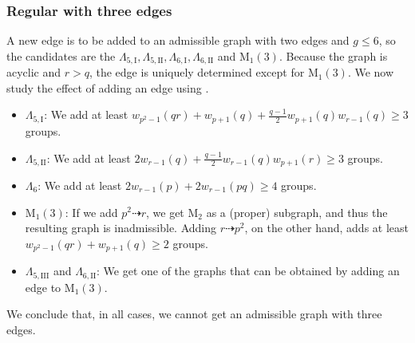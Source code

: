 \documentclass{article}
\newcommand{\qlame}{\Lambda_{5,\text{I}}}
\newcommand{\qlamz}{\Lambda_{5,\text{II}}}
\newcommand{\qlamd}{\Lambda_{5,\text{III}}}
\newcommand{\slame}{\Lambda_{6, \text{I}}}
\newcommand{\slamz}{\Lambda_{6, \text{II}}}
\newcommand{\m}[1]{\text{M}_{#1}}
\newcommand{\hthref}[1]{\hyperref[#1]{\thref{#1}}}
\theoremstyle{plain}
\theoremstyle{definition}
\begin{document}
\begin{center}
\end{center}
\subsubsection*{Regular  with three edges}
A new edge is to be added to an admissible graph with two edges and $g \le 6$, so the candidates are the $\qlame, \qlamz, \slame, \slamz$ and $\m1(3)$. Because the graph is acyclic and $r > q$, the edge is uniquely determined except for $\m1(3)$. We now study the effect of adding an edge using \hthref{euppqr}.
\begin{itemize}
	\item $\qlame$: We add at least $w_{p^2 - 1}(qr) + w_{p + 1}(q) + \frac{q - 1}{2}w_{p + 1}(q)w_{r - 1}(q) \ge 3$ groups.
	\item $\qlamz$: We add at least $2w_{r - 1}(q) + \frac{q - 1}{2} w_{r - 1}(q)w_{p + 1}(r) \ge 3$ groups.
	\item $\Lambda_6$: We add at least $2w_{r - 1}(p) + 2w_{r - 1}(pq) \ge 4$ groups.
	\item $\m1(3)$: If we add $p^2 \dashrightarrow r$, we get $\m{2}$ as a (proper) subgraph, and thus the resulting graph is inadmissible. Adding $r \dashrightarrow p^2$, on the other hand, adds at least $w_{p^2 - 1}(qr) + w_{p + 1}(q) \ge 2$ groups. \nopagebreak[4]
	\item $\qlamd$ and $\slamz$: We get one of the graphs that can be obtained by adding an edge to $\m1(3)$.
\end{itemize} \nopagebreak[4]
We conclude that, in all cases, we cannot get an admissible graph with three edges.
\end{document}
